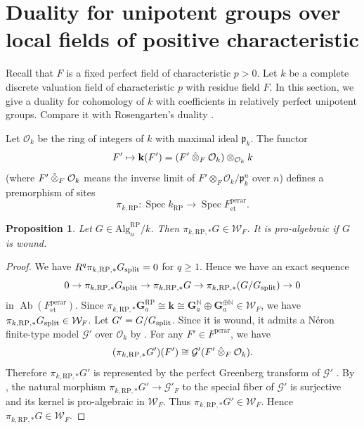 \documentclass{amsart}
\newtheorem{Prop}[Thm]{Proposition}
\theoremstyle{remark}
\numberwithin{equation}{section}
\newcommand{\Order}{\mathcal{O}}
\newcommand{\tensor}{\mathbin{\otimes}}
\newcommand{\N}{\mathbb{N}}
\newcommand{\et}{\mathrm{et}}
\newcommand{\Ga}{\mathbf{G}_{a}}
\newcommand{\perar}{\mathrm{perar}}
\newcommand{\Alg}{\mathrm{Alg}}
\newcommand{\alg}[1]{\mathbf{#1}}
\newcommand{\ideal}[1]{\mathfrak{#1}}
\newcommand{\ctensor}{\mathbin{\Hat{\otimes}}}
\newcommand{\RP}{\mathrm{RP}}
\DeclareMathOperator{\Spec}{Spec}
\DeclareMathOperator{\Ab}{Ab}
\begin{document}

\section{Duality for unipotent groups over local fields of positive characteristic}
\label{0007}

Recall that $F$ is a fixed perfect field of characteristic $p > 0$.
Let $k$ be a complete discrete valuation field of characteristic $p$ with residue field $F$.
In this section, we give a duality for cohomology of $k$
with coefficients in relatively perfect unipotent groups.
Compare it with Rosengarten's duality \cite{Ros18}.

Let $\Order_{k}$ be the ring of integers of $k$
with maximal ideal $\ideal{p}_{k}$.
The functor
	\[
			F'
		\mapsto
			\alg{k}(F')
		=
			(F' \ctensor_{F} \Order_{k}) \tensor_{\Order_{k}} k
	\]
(where $F' \ctensor_{F} \Order_{k}$ means
the inverse limit of $F' \tensor_{F} \Order_{k} / \ideal{p}_{k}^{n}$ over $n$)
defines a premorphism of sites
	\[
			\pi_{k, \RP}
		\colon
			\Spec k_{\RP}
		\to
			\Spec F^{\perar}_{\et}.
	\]

\begin{Prop} \label{0005}
	Let $G \in \Alg^{\RP}_{u} / k$.
	Then $\pi_{k, \RP, \ast} G \in \mathcal{W}_{F}$.
	It is pro-algebraic if $G$ is wound.
\end{Prop}

\begin{proof}
	We have $R^{q} \pi_{k, \RP, \ast} G_{\spl} = 0$ for $q \ge 1$.
	Hence we have an exact sequence
		\[
				0
			\to
				\pi_{k, \RP, \ast} G_{\spl}
			\to
				\pi_{k, \RP, \ast} G
			\to
				\pi_{k, \RP, \ast} (G / G_{\spl})
			\to
				0
		\]
	in $\Ab(F^{\perar}_{\et})$.
	Since $\pi_{k, \RP, \ast} \Ga^{\RP} \cong \alg{k} \cong \Ga^{\N} \oplus \Ga^{\oplus \N} \in \mathcal{W}_{F}$,
	we have $\pi_{k, \RP, \ast} G_{\spl} \in \mathcal{W}_{F}$.
	Let $G' = G / G_{\mathrm{split}}$.
	Since it is wound, it admits a N\'eron finite-type model $\mathcal{G}'$ over $\Order_{k}$
	by \cite[Section 10.2, Theorem 1]{BLR90}.
	For any $F' \in F^{\perar}$, we have
		\[
				(\pi_{k, \RP, \ast} G')(F')
			\cong
				\mathcal{G}'(F' \ctensor_{F} \Order_{k}).
		\]
	Therefore $\pi_{k, \RP, \ast} G'$ is represented by the perfect Greenberg transform of $\mathcal{G}'$
	\cite[Section 14, Equation (74)]{BGA18Green}.
	By \cite[Proposition 11.1]{BGA18Green}, the natural morphism
	$\pi_{k, \RP, \ast} G' \to \mathcal{G}'_{F}$ to the special fiber of $\mathcal{G}'$
	is surjective and its kernel is pro-algebraic in $\mathcal{W}_{F}$.
	Thus $\pi_{k, \RP, \ast} G' \in \mathcal{W}_{F}$.
	Hence $\pi_{k, \RP, \ast} G \in \mathcal{W}_{F}$.
\end{proof}
\end{document}
